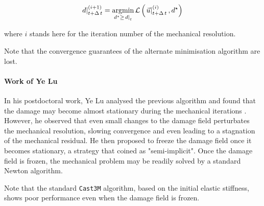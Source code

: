 \[
  \left.d\right|_{t+\Delta\,t}^{(i+1)} = \underset{d^{\star}\geq\left.d\right|_{t}}{\mathrm{argmin}{}}\, \mathcal{L}\left(\left.\vec{u}\right|_{t+\Delta\,t}^{(i)},d^{\star}\right)\\
\]

where \(i\) stands here for the iteration number of the mechanical
resolution.

Note that the convergence guarantees of the alternate minimisation
algorithm are lost.

\paragraph{Work of Ye Lu}

In his postdoctoral work, Ye Lu analysed the previous algorithm and
found that the damage may become almost stationary during the
mechanical iterations \cite{lu_schema_2019}. However, he observed that even
small changes to the damage field perturbates the mechanical resolution,
slowing convergence and even leading to a stagnation of the mechanical
residual. He then proposed to freeze the damage field once it becomes
stationary, a strategy that coined as "semi-implicit". Once the damage
field is frozen, the mechanical problem may be readily solved by a
standard Newton algorithm.

Note that the standard \texttt{Cast3M} algorithm, based on the initial elastic
stiffness, shows poor performance even when the damage field is
frozen.






